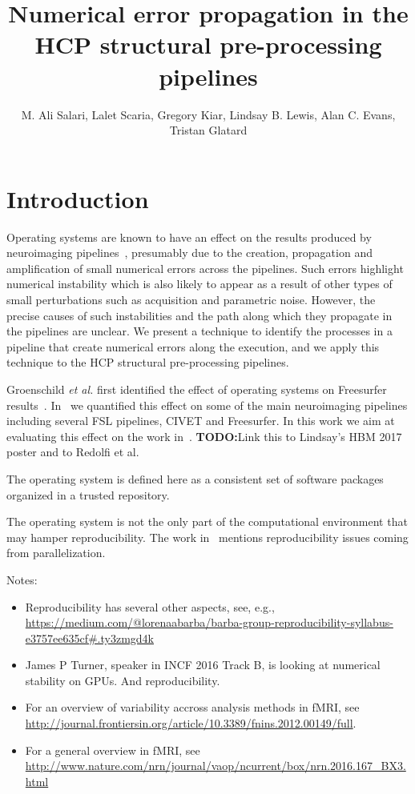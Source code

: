 \documentclass{article}
\title{Numerical error propagation in the HCP structural pre-processing pipelines}
\author{M. Ali Salari, Lalet Scaria, Gregory Kiar, Lindsay B. Lewis,
  Alan C. Evans, Tristan Glatard}
\newcommand{\todo}[1]{\color{red}\textbf{TODO:}#1\color{black}}
\begin{document}
\maketitle


\section{Introduction}

Operating systems are known to have an effect on the results produced
by neuroimaging pipelines~\cite{Gronenschild2012, Glatard2015},
presumably due to the creation, propagation and amplification of small
numerical errors across the pipelines.  Such errors highlight
numerical instability which is also likely to appear as a result of
other types of small perturbations such as acquisition and parametric
noise. However, the precise causes of
such instabilities and the path along which they propagate in the
pipelines are unclear.  We present a technique to identify the
processes in a pipeline that create numerical errors along the
execution, and we apply this technique to the HCP structural
pre-processing pipelines.


Groenschild \emph{et al.} first identified the effect of operating
systems on Freesurfer
results~\cite{Gronenschild2012}. In~\cite{10.3389/fninf.2015.00012} we
quantified this effect on some of the main neuroimaging pipelines
including several FSL pipelines, CIVET and Freesurfer. In this work we
aim at evaluating this effect on the work in~\cite{glasser2015multi}.
\todo{Link this to Lindsay's HBM 2017 poster and to Redolfi et al.}

The operating system is defined here as a consistent set of software
packages organized in a trusted repository.

The operating system is not the only part of the computational
environment that may hamper reproducibility. The work
in~\cite{diethelm2012limits} mentions reproducibility issues coming
from parallelization.

Notes:
\begin{itemize}
  \item Reproducibility has several other aspects, see, e.g.,
\url{https://medium.com/@lorenaabarba/barba-group-reproducibility-syllabus-e3757ee635cf#.ty3zmgd4k}
 \item James P Turner, speaker in INCF 2016 Track B, is looking at numerical stability on GPUs. And reproducibility.
 \item For an overview of variability accross analysis methods in fMRI, see \url{http://journal.frontiersin.org/article/10.3389/fnins.2012.00149/full}.
 \item For a general overview in fMRI, see \url{http://www.nature.com/nrn/journal/vaop/ncurrent/box/nrn.2016.167_BX3.html}
\end{itemize}
\end{document}
